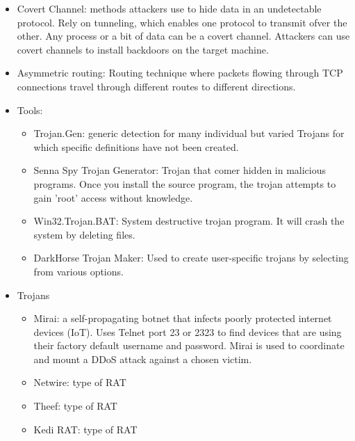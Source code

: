 \begin{itemize}
\begin{itemize}
    \end{itemize}
    \item Covert Channel: methods attackers use to hide data in an undetectable protocol. Rely on tunneling, which enables one protocol to transmit ofver the other. Any process or a bit of data can be a covert channel. Attackers can use covert channels to install backdoors on the target machine.
    \item Asymmetric routing: Routing technique where packets flowing through TCP connections travel through different routes to different directions.
    \item Tools:
    \begin{itemize}
        \item Trojan.Gen: generic detection for many individual but varied Trojans for which specific definitions have not been created.
        \item Senna Spy Trojan Generator: Trojan that comer hidden in malicious programs. Once you install the source program, the trojan attempts to gain 'root' access without knowledge.
        \item Win32.Trojan.BAT: System destructive trojan program. It will crash the system by deleting files.
        \item DarkHorse Trojan Maker: Used to create user-specific trojans by selecting from various options.
    \end{itemize}
    \item Trojans
    \begin{itemize}
        \item Mirai: a self-propagating botnet that infects poorly protected internet devices (IoT). Uses Telnet port 23 or 2323 to find devices that are using their factory default username and password. Mirai is used to coordinate and mount a DDoS attack against a chosen victim.
        \item Netwire: type of RAT
        \item Theef: type of RAT
        \item Kedi RAT: type of RAT
    \end{itemize}
\end{itemize}


